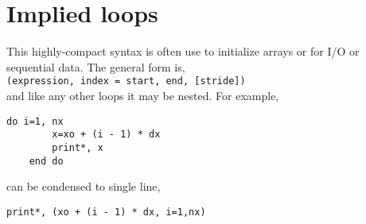 \documentclass[class=book,crop=false]{standalone}
\begin{document}
\section{Implied  loops}
This highly-compact syntax is often use to initialize arrays or for I/O or sequential data.
 The general form is,\\
 \lstinline[basicstyle=\ttfamily]{(expression, index = start, end, [stride])}\\
 and like any other  loops it may be nested. For example,
 \begin{lstlisting}[numbers=none]
    do i=1, nx
        x=xo + (i - 1) * dx
        print*, x
    end do
\end{lstlisting}
can be condensed to single line,
\begin{lstlisting}[numbers=none]
    print*, (xo + (i - 1) * dx, i=1,nx)
\end{lstlisting}
\end{document}
